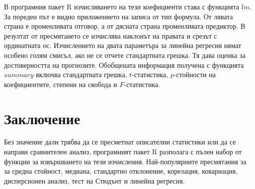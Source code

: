 В програмния пакет R изчисляването на тези коефициенти става с функцията $lm$. За пореден път е видно приложението на записа от тип формула. От лявата страна е променливата отговор, а от дясната страна променливата предиктор. В резултат от пресмятането се изчислява наклонът на правата и срезът с ординатната ос. Изчислението на двата параметъра за линейна регресия нямат особено голям смисъл, ако не се отчете стандартната грешка. Тя дава оценка за достоверността на прогнозите. Обобщената информация получена с функцията $summary$ включва стандартната грешка, $t$-статистика, $p$-стойности на коефициентите, степени на свобода и $F$-статистика.

\section*{Заключение}

Без значение дали трябва да се пресметнат описателни статистики или да се направи сравнителен анализ, програмният пакет R разполага с пълен набор от функции за извършването на тези изчисления. Най-популярните пресмятания за за средна стойност, медиана, стандартно отклонение, корелация, ковариация, дисперсионен анализ, тест на Стюдънт и линейна регресия. 

